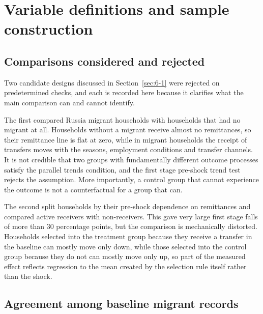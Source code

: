 \clearpage
\section{Variable definitions and sample construction}\label{app:C}

\subsection*{Comparisons considered and rejected}

Two candidate designs discussed in Section~\ref{sec:6-1} were rejected on predetermined checks, and each is recorded here because it clarifies what the main comparison can and cannot identify.

The first compared Russia migrant households with households that had no migrant at all. Households without a migrant receive almost no remittances, so their remittance line is flat at zero, while in migrant households the receipt of transfers moves with the seasons, employment conditions and transfer channels. It is not credible that two groups with fundamentally different outcome processes satisfy the parallel trends condition, and the first stage pre-shock trend test rejects the assumption. More importantly, a control group that cannot experience the outcome is not a counterfactual for a group that can.

The second split households by their pre-shock dependence on remittances and compared active receivers with non-receivers. This gave very large first stage falls of more than 30 percentage points, but the comparison is mechanically distorted. Households selected into the treatment group because they receive a transfer in the baseline can mostly move only down, while those selected into the control group because they do not can mostly move only up, so part of the measured effect reflects regression to the mean created by the selection rule itself rather than the shock.

\subsection*{Agreement among baseline migrant records}


